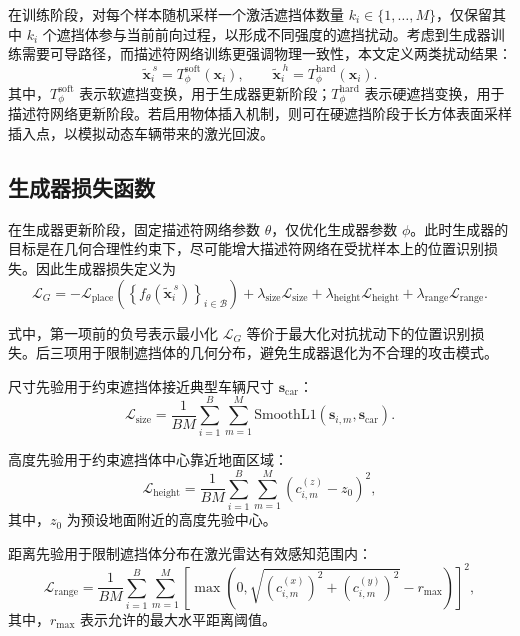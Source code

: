 \documentclass[UTF8,a4paper,12pt]{ctexart}
\newcommand{\setc}[1]{\left\{#1\right\}}
\begin{document}
在训练阶段，对每个样本随机采样一个激活遮挡体数量 $k_i\in\{1,\dots,M\}$，仅保留其中 $k_i$ 个遮挡体参与当前前向过程，以形成不同强度的遮挡扰动。考虑到生成器训练需要可导路径，而描述符网络训练更强调物理一致性，本文定义两类扰动结果：
\begin{equation}
\tilde{\bm{x}}^{\,s}_i=T^{\mathrm{soft}}_{\phi}(\bm{x}_i),\qquad
\tilde{\bm{x}}^{\,h}_i=T^{\mathrm{hard}}_{\phi}(\bm{x}_i).
\label{eq:soft_hard}
\end{equation}
其中，$T^{\mathrm{soft}}_{\phi}$ 表示软遮挡变换，用于生成器更新阶段；$T^{\mathrm{hard}}_{\phi}$ 表示硬遮挡变换，用于描述符网络更新阶段。若启用物体插入机制，则可在硬遮挡阶段于长方体表面采样插入点，以模拟动态车辆带来的激光回波。

\subsection{生成器损失函数}
在生成器更新阶段，固定描述符网络参数 $\theta$，仅优化生成器参数 $\phi$。此时生成器的目标是在几何合理性约束下，尽可能增大描述符网络在受扰样本上的位置识别损失。因此生成器损失定义为
\begin{equation}
\mathcal{L}_{G}
=
-\mathcal{L}_{\mathrm{place}}
\left(
\setc{
f_{\theta}\!\left(\tilde{\bm{x}}^{\,s}_i\right)
}_{i\in\mathcal{B}}
\right)
+
\lambda_{\mathrm{size}}\mathcal{L}_{\mathrm{size}}
+
\lambda_{\mathrm{height}}\mathcal{L}_{\mathrm{height}}
+
\lambda_{\mathrm{range}}\mathcal{L}_{\mathrm{range}}.
\label{eq:loss_g}
\end{equation}

式中，第一项前的负号表示最小化 $\mathcal{L}_{G}$ 等价于最大化对抗扰动下的位置识别损失。后三项用于限制遮挡体的几何分布，避免生成器退化为不合理的攻击模式。

尺寸先验用于约束遮挡体接近典型车辆尺寸 $\bm{s}_{\mathrm{car}}$：
\begin{equation}
\mathcal{L}_{\mathrm{size}}
=
\frac{1}{BM}
\sum_{i=1}^{B}\sum_{m=1}^{M}
\mathrm{SmoothL1}\!\left(\bm{s}_{i,m},\bm{s}_{\mathrm{car}}\right).
\label{eq:size_prior}
\end{equation}

高度先验用于约束遮挡体中心靠近地面区域：
\begin{equation}
\mathcal{L}_{\mathrm{height}}
=
\frac{1}{BM}
\sum_{i=1}^{B}\sum_{m=1}^{M}
\left(c_{i,m}^{(z)}-z_{0}\right)^{2},
\label{eq:height_prior}
\end{equation}
其中，$z_{0}$ 为预设地面附近的高度先验中心。

距离先验用于限制遮挡体分布在激光雷达有效感知范围内：
\begin{equation}
\mathcal{L}_{\mathrm{range}}
=
\frac{1}{BM}
\sum_{i=1}^{B}\sum_{m=1}^{M}
\left[
\max\!\left(
0,\sqrt{\left(c_{i,m}^{(x)}\right)^{2}+\left(c_{i,m}^{(y)}\right)^{2}}-r_{\max}
\right)
\right]^{2},
\label{eq:range_prior}
\end{equation}
其中，$r_{\max}$ 表示允许的最大水平距离阈值。
\end{document}
